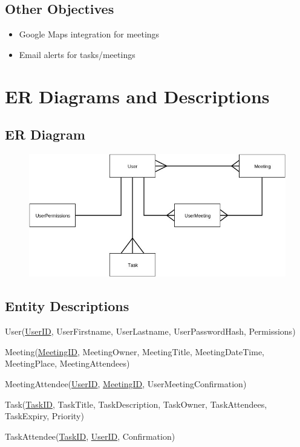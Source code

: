\subsection{Other Objectives}
	\begin{itemize}
		\item Google Maps integration for meetings
		\item Email alerts for tasks/meetings
	\end{itemize}

\section{ER Diagrams and Descriptions}

\subsection{ER Diagram}

\begin{figure}[H]
	\includegraphics[width=\textwidth]{./Analysis/diagrams/era.jpg}
\end{figure}

\subsection{Entity Descriptions}

User(\underline{UserID}, UserFirstname, UserLastname, UserPasswordHash, Permissions)

Meeting(\underline{MeetingID}, MeetingOwner, MeetingTitle, MeetingDateTime, MeetingPlace, MeetingAttendees)

MeetingAttendee(\underline{UserID}, \underline{MeetingID}, UserMeetingConfirmation)

Task(\underline{TaskID}, TaskTitle, TaskDescription, TaskOwner, TaskAttendees, TaskExpiry, Priority)

TaskAttendee(\underline{TaskID}, \underline{UserID}, Confirmation)


